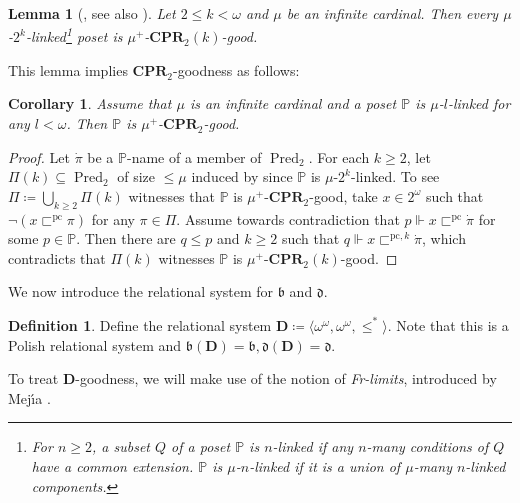 \documentclass[a4paper,12pt]{amsart}
\newtheorem{lem}[thm]{Lemma}
\newtheorem{cor}[thm]{Corollary}
\theoremstyle{definition}
\newtheorem{dfn}[thm]{Definition}
\numberwithin{thm}{section}
\numberwithin{equation}{section}
\newcommand{\p}{\mathbb{P}}
\newcommand{\oo}{{\omega}^\omega}
\newcommand{\bb}{\mathfrak{b}}
\newcommand{\dd}{\mathfrak{d}}
\DeclareMathOperator{\Pred}{Pred}
\renewcommand{\subset}{\subseteq}
\newcommand{\pc}{\sqsubset^{\mathrm{pc}}}
\newcommand{\pck}{\sqsubset^{\mathrm{pc},k}}
\begin{document}
    \begin{lem}[{\cite{BS03}, see also \cite[Lemma 5.29]{CR25}}] 
    \label{lem:twok_linked_CPR_good}
        Let $2\leq k<\omega$ and $\mu$ be an infinite cardinal. Then every $\mu$-$2^k$-linked\footnote{For $n\geq2$, a subset $Q$ of a poset $\p$ is \textit{$n$-linked} if any $n$-many conditions of $Q$ have a common extension. $\p$ is \textit{$\mu$-$n$-linked} if it is a union of $\mu$-many $n$-linked components.} poset is $\mu^+$-$\mathbf{CPR}_2(k)$-good.
    \end{lem}
    
    This lemma implies $\mathbf{CPR}_2$-goodness as follows:
    
    \begin{cor}\label{cor:infty_linked_CPR_good}
        Assume that $\mu$ is an infinite cardinal and a poset $\p$ is $\mu$-$l$-linked for any $l<\omega$. Then $\p$ is $\mu^+$-$\mathbf{CPR}_2$-good.
    \end{cor}
    \begin{proof}
        Let $\dot{\pi}$ be a $\p$-name of a member of $\Pred_2$. For each $k\geq2$, let $\Pi(k)\subset\Pred_2$ of size $\leq\mu$ induced by  since $\p$ is $\mu$-$2^k$-linked. To see $\Pi\coloneqq\bigcup_{k\geq2}\Pi(k)$ witnesses that $\p$ is $\mu^+$-$\mathbf{CPR}_2$-good, take $x\in 2^\omega$ such that $\lnot(x\pc \pi)$ for any $\pi\in\Pi$. Assume towards contradiction that $p\Vdash x\pc \dot{\pi}$ for some $p\in\p$. Then there are $q\leq p$ and $k\geq 2$ such that $q\Vdash x\pck\dot{\pi}$, which contradicts that $\Pi(k)$ witnesses $\p$ is $\mu^+$-$\mathbf{CPR}_2(k)$-good.
    \end{proof}
    
    We now introduce the relational system for $\bb$ and $\dd$.
    
    \begin{dfn}
        Define the relational system $\mathbf{D}\coloneqq\langle \oo,\oo,\leq^*\rangle$. Note that this is a Polish relational system and $\bb(\mathbf{D})=\bb, \dd(\mathbf{D})=\dd$.
    \end{dfn}
    
    To treat $\mathbf{D}$-goodness, we will make use of the notion of \textit{Fr-limits}, introduced by Mej{\'\i}a \cite{Mej19}.
    
\end{document}
